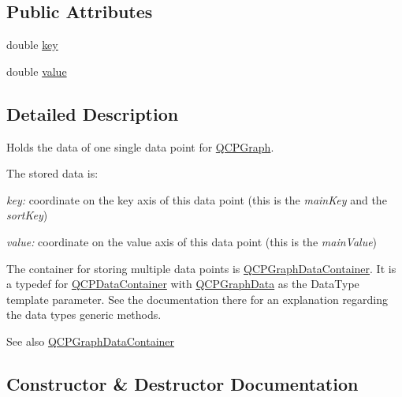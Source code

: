 \subsection*{Public Attributes}
\begin{DoxyCompactItemize}
\item 
double \mbox{\hyperlink{class_q_c_p_graph_data_a2fcebdf84af975761c0661237d7e28ec}{key}}
\item 
double \mbox{\hyperlink{class_q_c_p_graph_data_ac97e3ddbdcbe0b58d0b4d6f95250d59c}{value}}
\end{DoxyCompactItemize}


\subsection{Detailed Description}
Holds the data of one single data point for \mbox{\hyperlink{class_q_c_p_graph}{Q\+C\+P\+Graph}}. 

The stored data is\+: \begin{DoxyItemize}
\item {\itshape key\+:} coordinate on the key axis of this data point (this is the {\itshape main\+Key} and the {\itshape sort\+Key}) \item {\itshape value\+:} coordinate on the value axis of this data point (this is the {\itshape main\+Value})\end{DoxyItemize}
The container for storing multiple data points is \mbox{\hyperlink{qcustomplot_8h_a2e5583d1ae212f0deb10537cf975a15a}{Q\+C\+P\+Graph\+Data\+Container}}. It is a typedef for \mbox{\hyperlink{class_q_c_p_data_container}{Q\+C\+P\+Data\+Container}} with \mbox{\hyperlink{class_q_c_p_graph_data}{Q\+C\+P\+Graph\+Data}} as the Data\+Type template parameter. See the documentation there for an explanation regarding the data type\textquotesingle{}s generic methods.

\begin{DoxySeeAlso}{See also}
\mbox{\hyperlink{qcustomplot_8h_a2e5583d1ae212f0deb10537cf975a15a}{Q\+C\+P\+Graph\+Data\+Container}} 
\end{DoxySeeAlso}


\subsection{Constructor \& Destructor Documentation}
\mbox{\label{class_q_c_p_graph_data_ac43f7499383d2fa2ffb7a4ad43f76c7c}} 
